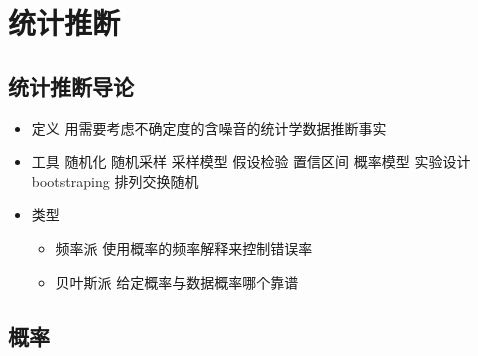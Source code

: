 \documentclass[]{book}
\providecommand{\tightlist}{%
  \setlength{\itemsep}{0pt}\setlength{\parskip}{0pt}}
\begin{document}
\chapter{统计推断}

\section{统计推断导论}

\begin{itemize}
\tightlist
\item
  定义 用需要考虑不确定度的含噪音的统计学数据推断事实
\item
  工具 随机化 随机采样 采样模型 假设检验 置信区间 概率模型 实验设计 bootstraping 排列交换随机
\item
  类型

  \begin{itemize}
  \tightlist
  \item
    频率派 使用概率的频率解释来控制错误率
  \item
    贝叶斯派 给定概率与数据概率哪个靠谱
  \end{itemize}
\end{itemize}

\section{概率}
\end{document}
